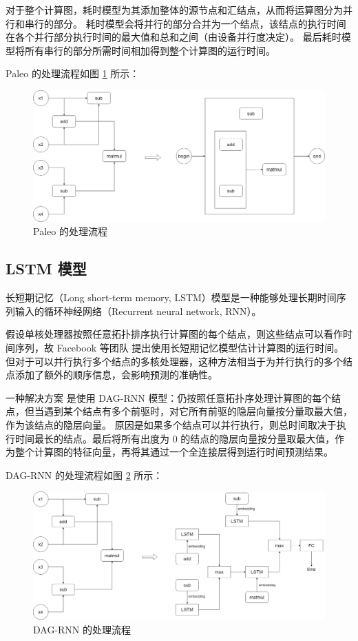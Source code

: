 对于整个计算图，耗时模型为其添加整体的源节点和汇结点，从而将运算图分为并行和串行的部分。
耗时模型会将并行的部分合并为一个结点，该结点的执行时间在各个并行部分执行时间的最大值和总和之间（由设备并行度决定）。
最后耗时模型将所有串行的部分所需时间相加得到整个计算图的运行时间。

Paleo 的处理流程如图 \ref{fig:graph2} 所示：
\begin{figure}[h]
  \centering
  \includegraphics[width=1\textwidth]{figures/graph2.png}
  \caption{Paleo 的处理流程}
  \label{fig:graph2}
\end{figure}

\subsection{LSTM 模型}

长短期记忆\cite{LSTM_origin}（Long short-term memory, LSTM）模型是一种能够处理长期时间序列输入的循环神经网络\cite{RNN}（Recurrent neural network, RNN）。

假设单核处理器按照任意拓扑排序执行计算图的每个结点，则这些结点可以看作时间序列，故 Facebook 等团队 \cite{LSTM1} \cite{LSTM2} 提出使用长短期记忆模型估计计算图的运行时间。
但对于可以并行执行多个结点的多核处理器，这种方法相当于为并行执行的多个结点添加了额外的顺序信息，会影响预测的准确性。

一种解决方案 \cite{LSTM1} 是使用 DAG-RNN \cite{DAG-RNN} 模型：仍按照任意拓扑序处理计算图的每个结点，但当遇到某个结点有多个前驱时，对它所有前驱的隐层向量按分量取最大值，作为该结点的隐层向量。
原因是如果多个结点可以并行执行，则总时间取决于执行时间最长的结点。最后将所有出度为 0 的结点的隐层向量按分量取最大值，作为整个计算图的特征向量，再将其通过一个全连接层得到运行时间预测结果。

DAG-RNN 的处理流程如图 \ref{fig:graph3} 所示：

\begin{figure}[h]
    \centering
    \includegraphics[width=1\textwidth]{figures/graph1.png}
    \caption{DAG-RNN 的处理流程}
    \label{fig:graph3}
\end{figure}

